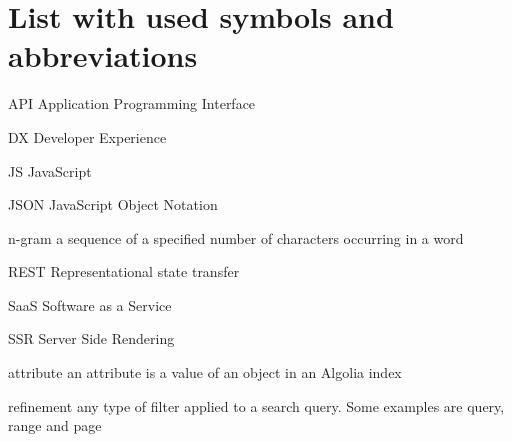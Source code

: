 
\chapter*{List with used symbols and abbreviations}

\begin{abbreviations}
\item[API] Application Programming Interface
\item[DX] Developer Experience
\item[JS] JavaScript
\item[JSON] JavaScript Object Notation
\item[n-gram] a sequence of a specified number of characters occurring in a word\cite{kimbrell1988searching}
\item[REST] Representational state transfer\cite{fielding2000architectural}
\item[SaaS] Software as a Service
\item[SSR] Server Side Rendering
\item[attribute] an attribute is a value of an object in an Algolia index
\item[refinement] any type of filter applied to a search query. Some examples are query, range and page
\end{abbreviations}
